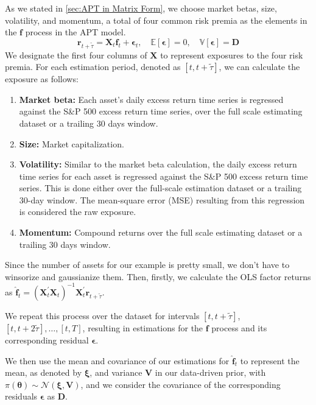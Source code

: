 \documentclass[13pt]{article}
\theoremstyle{definition}
\theoremstyle{remark}
\newenvironment{remark}
  {\pushQED{\qed}\renewcommand{\qedsymbol}{$\triangle$}\remarkx}
  {\popQED\endremarkx}
\begin{document}
\begin{enumerate}
As we stated in \cref{sec:APT in Matrix Form}, we choose market betas, size, volatility, and momentum, a total of four common risk premia as the elements in the $\bm{f}$ process in the APT model.  
$$
\boldsymbol{r}_{t+\tilde{\tau}}=\mathbf{X}_t \boldsymbol{f}_t+\boldsymbol{\epsilon}_t, \quad \mathbb{E}[\boldsymbol{\epsilon}]=0, \quad \mathbb{V}[\boldsymbol{\epsilon}]=\mathbf{D}
$$
We designate the first four columns of $\mathbf{X}$ to represent exposures to the four risk premia. For each estimation period, denoted as $[t, t+\tilde{\tau}]$, we can calculate the exposure as follows:
\begin{enumerate}
    \item \textbf{Market beta:} Each asset's daily excess return time series is  regressed against the S\&P 500 excess return time series, over the full scale estimating dataset or a trailing 30 days window.
    \item \textbf{Size:}  Market capitalization.
    \item \textbf{Volatility:} Similar to the market beta calculation, the daily excess return time series for each asset is regressed against the S\&P 500 excess return time series. This is done either over the full-scale estimation dataset or a trailing 30-day window. The mean-square error (MSE) resulting from this regression is considered the raw exposure.
    \item \textbf{Momentum:}  Compound returns over the full scale estimating dataset or a trailing 30 days window.
\end{enumerate}
\begin{remark}
    Since the number of assets for our example is pretty small, we don't have to winsorize and gaussianize them.
\end{remark}
Then, firstly, we calculate the OLS factor returns as $\hat{\boldsymbol{f}}_t=\left(\boldsymbol{X}_t^{\prime} \boldsymbol{X}_t\right)^{-1} \boldsymbol{X}_t^{\prime} \boldsymbol{r}_{t+\tilde{\tau}}$.

We repeat this process over the dataset for intervals $[t, t+\tilde{\tau}]$, $[t, t+2\tilde{\tau}], \ldots, [t, T]$, resulting in estimations for the $\bm{f}$ process and its corresponding residual $\bm{\epsilon}$.

We then use the mean and covariance of our estimations for $\hat{\boldsymbol{f}}_t$ to represent the mean, as denoted by $\bm{\xi}$, and variance $\mathbf{V}$ in our data-driven prior, with $\pi(\bm{\theta})\sim\mathcal{N}\left(\bm{\xi}, \mathbf{V}\right)$, and we consider the covariance of the corresponding residuals $\bm{\epsilon}$ as $\mathbf{D}$.


\end{enumerate}
\end{document}
